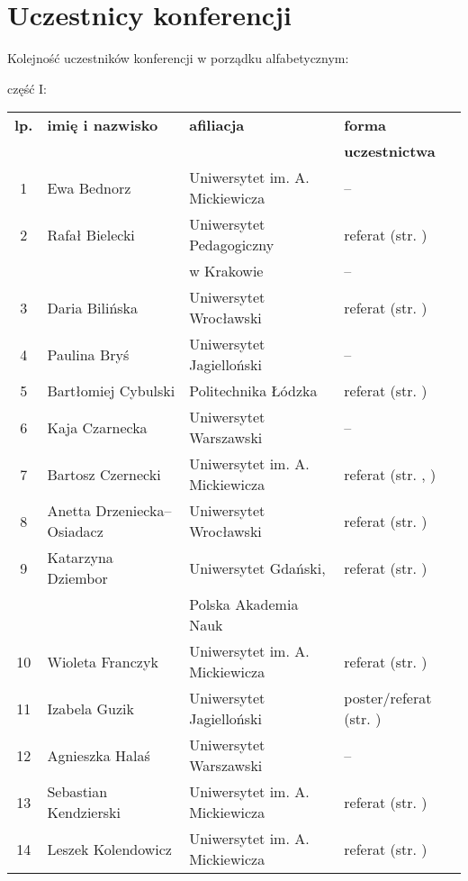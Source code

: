 \documentclass[12pt,oneside]{book}
\begin{document}
\chapter{Uczestnicy konferencji}

Kolejność uczestników konferencji w porządku alfabetycznym:

\vspace{1cm}

\Large część I:

\normalsize
\begin{tabular}{||c|l|l|l||}
\hline
\hline
\textbf{lp.} & \textbf{imię i nazwisko} & \textbf{afiliacja} & \textbf{forma}\\
 &  &  & \textbf{uczestnictwa}\\
\hline
\hline
\hline
1	 & Ewa Bednorz & Uniwersytet im. A. Mickiewicza & -- \\\hline
2	 & Rafał Bielecki & Uniwersytet Pedagogiczny & referat (str. \pageref{bielecki})\\
	 &  & w Krakowie & -- \\\hline
3	 & Daria Bilińska & Uniwersytet Wrocławski & referat (str. \pageref{bilinska}) \\\hline
4	 & Paulina Bryś & Uniwersytet Jagielloński & -- \\\hline
5	 & Bartłomiej Cybulski & Politechnika Łódzka & referat (str. \pageref{cybulski}) \\\hline
6	 & Kaja Czarnecka & Uniwersytet Warszawski & -- \\\hline
7	 & Bartosz Czernecki & Uniwersytet im. A. Mickiewicza & referat (str. \pageref{kolendowicz}, \pageref{taszarek}) \\\hline
8	 & Anetta Drzeniecka--Osiadacz & Uniwersytet Wrocławski & referat (str. \pageref{bilinska}) \\\hline
9 	 & Katarzyna Dziembor & Uniwersytet Gdański, & referat (str. \pageref{dziembor})\\
		 &  & Polska Akademia Nauk &  \\\hline
10	 & Wioleta Franczyk & Uniwersytet im. A. Mickiewicza & referat  (str. \pageref{franczyk})\\\hline
11	 & Izabela Guzik & Uniwersytet Jagielloński & poster/referat (str. \pageref{guzik})\\\hline	
 12	 & Agnieszka Halaś & Uniwersytet Warszawski & -- \\\hline	
 13 & Sebastian Kendzierski & Uniwersytet im. A. Mickiewicza & referat (str. \pageref{kendzierski}) \\\hline
 14	 & Leszek Kolendowicz & Uniwersytet im. A. Mickiewicza & referat (str. \pageref{kolendowicz}) \\\hline

\end{tabular}
\end{document}

